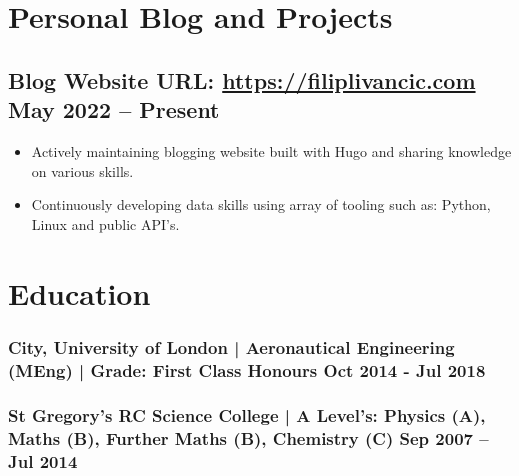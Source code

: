 \documentclass[a4paper,9pt]{article}
\begin{document}
\section*{Personal Blog and Projects}

\subsection*{\textbf{Blog Website URL}: \url{https://filiplivancic.com} \hfill  May 2022 – Present}
\begin{itemize}[noitemsep]
	\item  Actively maintaining blogging website built with Hugo and sharing knowledge on various skills.
    \item  Continuously developing data skills using array of tooling such as: Python, Linux and public API's.
\end{itemize}

\section*{Education}
\subsubsection*{\textbf {City, University of London | Aeronautical Engineering (MEng)} | Grade: First Class Honours   \hfill \textbf{Oct 2014 - Jul 2018}}\FloatBarrier

\subsubsection*{\textbf{St Gregory’s RC Science College} | A Level's: Physics (A), Maths (B), Further Maths (B), Chemistry (C)  \hfill  \textbf{Sep 2007 – Jul 2014}}

\date{}
\end{document}
